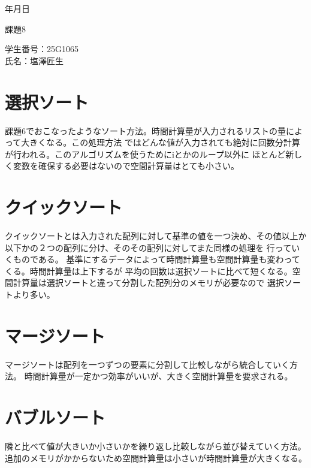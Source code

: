 \documentclass[uplatex]{jsarticle}
\begin{document}
\begin{flushright}
    \number\year 年\number\month 月\number\day 日
\end{flushright}

\begin{center}
    {\LARGE 課題8}
\end{center}

\begin{flushright}
    学生番号：25G1065\\
    氏名：塩澤匠生
\end{flushright}


\section{選択ソート}
課題6でおこなったようなソート方法。時間計算量が入力されるリストの量によって大きくなる。この処理方法
ではどんな値が入力されても絶対に回数分計算が行われる。このアルゴリズムを使うためにiとかのループ以外に
ほとんど新しく変数を確保する必要はないので空間計算量はとても小さい。
\section{クイックソート}
クイックソートとは入力された配列に対して基準の値を一つ決め、その値以上か以下かの２つの配列に分け、そのその配列に対してまた同様の処理を
行っていくものである。
基準にするデータによって時間計算量も空間計算量も変わってくる。時間計算量は上下するが
平均の回数は選択ソートに比べて短くなる。空間計算量は選択ソートと違って分割した配列分のメモリが必要なので
選択ソートより多い。

\section{マージソート}
マージソートは配列を一つずつの要素に分割して比較しながら統合していく方法。
時間計算量が一定かつ効率がいいが、大きく空間計算量を要求される。

\section{バブルソート}
隣と比べて値が大きいか小さいかを繰り返し比較しながら並び替えていく方法。
追加のメモリがかからないため空間計算量は小さいが時間計算量が大きくなる。
\end{document}
